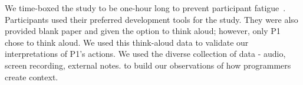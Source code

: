 

We time-boxed the study to be one-hour long to prevent participant fatigue~\cite{Easterbrook:2008}. Participants used their preferred development tools for the study. They were also provided blank paper and given the option to think aloud; however, only P1 chose to think aloud. We used this think-aloud data to validate our interpretations of P1's actions. We used the diverse collection of data - audio, screen recording, external notes. to build our observations of how programmers create context.



